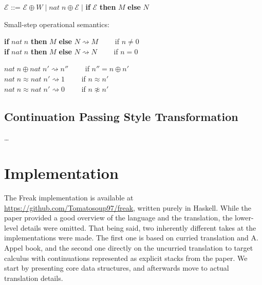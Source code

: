 \documentclass[declaration,shortabstract]{iithesis}
\begin{document}
    \begin{flushleft}
    $\mathcal{E}$ ::= $ \mathcal{E} \oplus W \; | \; nat \; n \oplus \mathcal{E} \; |$ \textbf{if} $\mathcal{E}$ \textbf{then} $M$ \textbf{else} $N$
    \end{flushleft}

    \begin{flushleft}
    Small-step operational semantics:
    \end{flushleft}

    \begin{flushleft}
    \textbf{if} $nat \; n$ \textbf{then} $M$ \textbf{else} $N \rightsquigarrow M \quad \quad $ if $n \neq 0$ \\
    \textbf{if} $nat \; n$ \textbf{then} $M$ \textbf{else} $N \rightsquigarrow N \quad \quad $ if $n = 0$
    \end{flushleft}

    \begin{flushleft}
    $nat \; n \oplus nat \; n' \rightsquigarrow n'' \quad \quad $    if $ n'' = n \oplus n' $ \\
    $nat \; n \approx nat \; n' \rightsquigarrow 1  \quad \quad $    \; if $ n \approx n' $ \\
    $nat \; n \approx nat \; n' \rightsquigarrow 0  \quad \quad $    \; if $ n \not\approx n' $

    \end{flushleft}

\section{Continuation Passing Style Transformation}
    \ldots

\chapter{Implementation}
\label{sec:implementation}

    The Freak implementation is available at \href{https://github.com/Tomatosoup97/freak}{\underline{https://github.com/Tomatosoup97/freak}},
    written purely in Haskell. While the paper provided a good overview of the
    language and the translation, the lower-level details were omitted. That
    being said, two inherently different takes at the implementations were made.
    The first one is based on curried translation and A. Appel \cite{appel-continuations}
    book, and the second one directly on the uncurried translation to target
    calculus with continuations represented as explicit stacks from the paper.
    We start by presenting core data structures, and afterwards move to actual
    translation details.
\end{document}
